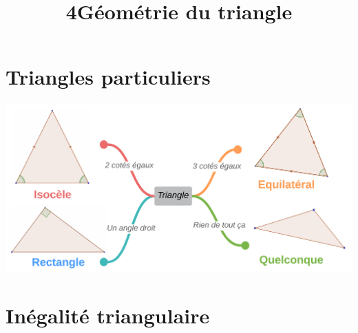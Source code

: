 \documentclass[12pt,a4paper]{article}
\date{}
\title{\textcircled{{\normalsize{4}}}Géométrie du triangle}
\begin{document}
\maketitle








\section{Triangles particuliers}

\begin{center}
	\includegraphics[scale=0.81]{triangles}
\end{center}

\newpage

\section{Inégalité triangulaire}





%
%

%
%
%
\end{document}
